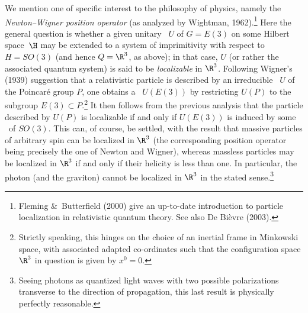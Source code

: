 \documentclass[12pt]{article}
\newcommand{\Hs}{Hilbert space} \newcommand{\Bs}{Banach space}
\begin{document}
 We mention one of specific interest to the philosophy of physics, namely the {\it Newton--Wigner position operator} (as analyzed by Wightman, 1962).\footnote{Fleming \&\  Butterfield (2000) give an up-to-date introduction to particle localization in relativistic quantum theory. See also De Bi\`{e}vre (2003).}  
Here the general question is whether a given unitary \rep\ $U$ of $G=E(3)$ on some \Hs\ $\H$ may be extended to a system of imprimitivity with respect to $H=SO(3)$ (and hence
$Q=\R^3$, as above); in that case, $U$ (or rather the associated quantum system) is  said to be {\it localizable} in $\R^3$.  Following Wigner's (1939) suggestion that a relativistic  particle is described by an irreducible \rep\ $U$ of the Poincar\'{e} group $P$, one obtains a \rep\ $U(E(3))$ by restricting
$U(P)$ to the subgroup $E(3)\subset P$.\footnote{Strictly speaking, this hinges on the choice of an inertial frame in Minkowski space, with associated adapted co-ordinates such that the configuration space $\R^3$ in question is given by $x^0=0$.}  It then follows from the previous analysis that the particle described by $U(P)$ is localizable if and only if $U(E(3))$ is induced by some \rep\ of $SO(3)$. This can, of course, be settled, with the result that massive particles of arbitrary spin can be localized in $\R^3$ (the corresponding position operator being precisely the one of Newton and Wigner), whereas
 massless particles may be localized in $\R^3$ if and only if their helicity is less than one. In particular,  the photon (and the graviton) cannot be localized
in $\R^3$ in the stated sense.\footnote{
Seeing photons as quantized light waves with two possible polarizations
transverse to the direction of propagation, this last result is physically
perfectly reasonable. }
\end{document}
